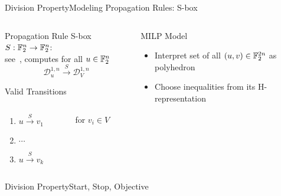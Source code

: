 \begin{frame}{Division Property}{Modeling Propagation Rules: S-box}
    \begin{columns}
        \begin{column}{0.35\textwidth}
            \begin{block}{Propagation Rule}
                \centering
                S-box $S : \mathbb{F}_2^n \to \mathbb{F}_2^n$:\\
                see~\cite[Algorithm~2]{AC:XZBL16},
                computes for all $u \in \mathbb{F}_2^n$\\
                \vspace*{-15pt}
                \begin{equation*}
                    \mathcal{D}^{1,n}_{u} \stackrel{S}{\to} \mathcal{D}^{1,n}_V
                \end{equation*}
            \end{block}
            \begin{block}{Valid Transitions}
                \begin{columns}
                    \begin{column}{0.5\linewidth}
                        \begin{enumerate}
                            \item \quad $u \stackrel{S}{\to} v_1$
                            \item[] \quad \hspace{4pt} $\cdots$
                            \item[\tikz{\node[scale=0.8,minimum width=2pt,minimum height=2pt,color=white,fill=saphierblau]{\scriptsize$k$}}] \quad $u \stackrel{S}{\to} v_k$
                        \end{enumerate}
                    \end{column}
                    \begin{column}{0.5\linewidth}
                        for $v_i \in V$
                    \end{column}
                \end{columns}
            \end{block}
            \pause
        \end{column}
        \begin{column}{0.575\textwidth}
            \begin{block}{MILP Model}
            \begin{itemize}
                \item Interpret set of all $(u, v) \in \mathbb{F}_2^{2n}$ as polyhedron
                \item Choose inequalities from its H-representation
            \end{itemize}
            \end{block}
        \end{column}
    \end{columns}
\end{frame}


\begin{frame}{Division Property}{Start, Stop, Objective}
\end{frame}

